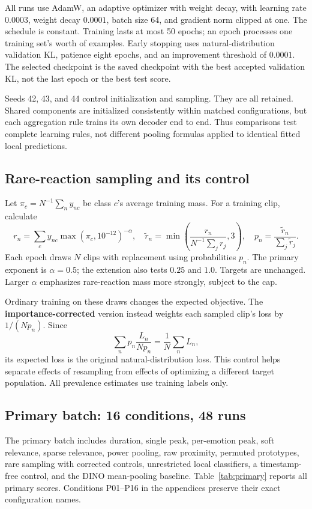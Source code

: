 \documentclass[11pt,a4paper]{article}
\begin{document}
All runs use AdamW, an adaptive optimizer with weight decay, with learning rate $0.0003$, weight decay $0.0001$, batch size 64, and gradient norm clipped at one. The schedule is constant. Training lasts at most 50 epochs; an epoch processes one training set's worth of examples. Early stopping uses natural-distribution validation KL, patience eight epochs, and an improvement threshold of $0.0001$. The selected checkpoint is the saved checkpoint with the best accepted validation KL, not the last epoch or the best test score.

Seeds 42, 43, and 44 control initialization and sampling. They are all retained. Shared components are initialized consistently within matched configurations, but each aggregation rule trains its own decoder end to end. Thus comparisons test complete learning rules, not different pooling formulas applied to identical fitted local predictions.

\subsection{Rare-reaction sampling and its control}
Let $\pi_c=N^{-1}\sum_n y_{nc}$ be class $c$'s average training mass. For a training clip, calculate
\begin{equation}
r_n=\sum_c y_{nc}\max(\pi_c,10^{-12})^{-\alpha},\quad
\widetilde r_n=\min\!\left(\frac{r_n}{N^{-1}\sum_jr_j},3\right),\quad
p_n=\frac{\widetilde r_n}{\sum_j\widetilde r_j}.
\end{equation}
Each epoch draws $N$ clips with replacement using probabilities $p_n$. The primary exponent is $\alpha=0.5$; the extension also tests $0.25$ and $1.0$. Targets are unchanged. Larger $\alpha$ emphasizes rare-reaction mass more strongly, subject to the cap.

Ordinary training on these draws changes the expected objective. The \textbf{importance-corrected} version instead weights each sampled clip's loss by $1/(Np_n)$. Since
\[
\sum_np_n\frac{L_n}{Np_n}=\frac{1}{N}\sum_nL_n,
\]
its expected loss is the original natural-distribution loss. This control helps separate effects of resampling from effects of optimizing a different target population. All prevalence estimates use training labels only.

\subsection{Primary batch: 16 conditions, 48 runs}
The primary batch includes duration, single peak, per-emotion peak, soft relevance, sparse relevance, power pooling, raw proximity, permuted prototypes, rare sampling with corrected controls, unrestricted local classifiers, a timestamp-free control, and the DINO mean-pooling baseline. Table~\ref{tab:primary} reports all primary scores. Conditions P01--P16 in the appendices preserve their exact configuration names.
\end{document}
